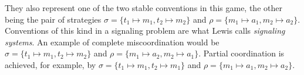 \documentclass[a4paper]{article}
\begin{document}
They also represent one of the two stable conventions in this game, the other being the pair of strategies $\sigma = \lbrace t_1 \mapsto m_1, t_2 \mapsto m_2 \rbrace$ and $\rho = \lbrace m_1 \mapsto a_1, m_2 \mapsto a_2 \rbrace$.
Conventions of this kind in a signaling problem are what Lewis calls \emph{signaling systems}.
An example of complete miscoordination would be $\sigma = \lbrace t_1 \mapsto m_1, t_2 \mapsto m_2 \rbrace$ and $\rho = \lbrace m_1 \mapsto a_2, m_2 \mapsto a_1 \rbrace$.
Partial coordination is achieved, for example, by $\sigma = \lbrace t_1 \mapsto m_1, t_2 \mapsto m_1 \rbrace$ and $\rho = \lbrace m_1 \mapsto a_1, m_2 \mapsto a_2 \rbrace$.
\end{document}
